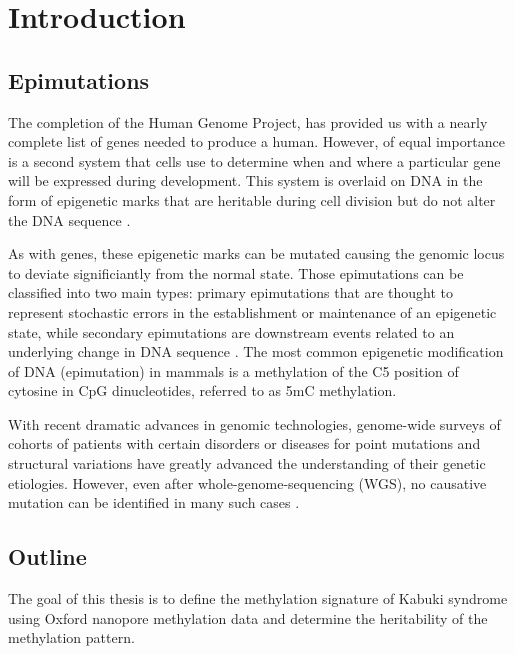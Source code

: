 \chapter{Introduction}

\section{Epimutations}
The completion of the Human Genome Project, has provided us with a nearly complete list of genes needed to produce a human. However, of equal importance is a second system that cells use to determine when and where a particular gene will be expressed during development. This system is overlaid on DNA in the form of epigenetic marks that are heritable during cell division but do not alter the DNA sequence \cite{robertson2005dna}. 

As with genes, these epigenetic marks can be mutated causing the genomic locus to deviate significiantly from the normal state. Those epimutations can be classified into two main types: primary epimutations that are thought to represent stochastic errors in the establishment or maintenance of an epigenetic state, while secondary epimutations are downstream events related to an underlying change in DNA sequence \cite{horsthemke2006epimutations}. The most common epigenetic modification of DNA (epimutation) in mammals is a methylation of the C5 position of cytosine in CpG dinucleotides, referred to as 5mC methylation. 

With recent dramatic advances in genomic technologies, genome-wide surveys of cohorts of patients with certain disorders or diseases for point mutations and structural variations have greatly advanced the understanding of their genetic etiologies. However, even after whole-genome-sequencing (WGS), no causative mutation can be identified in many such cases \cite{barbosa2018identification}. %

\section{Outline}
The goal of this thesis is to define the methylation signature of Kabuki syndrome using Oxford nanopore methylation data and determine the heritability of the methylation pattern.